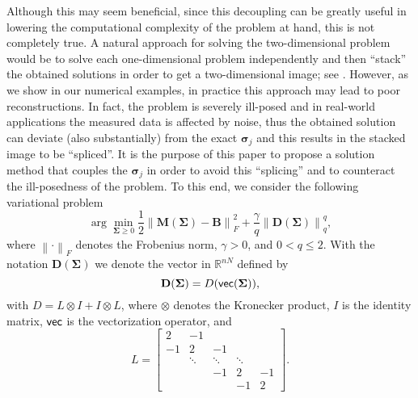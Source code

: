 \documentclass[final,leqno]{siamltex}
\newcommand{\R}{{\mathbb R}}
\newcommand{\ts}[1]{\mbox{\textsf{#1}}}
\newcommand{\norm}[1]{\left\| #1 \right\|}
\newcommand{\sigmab}{\boldsymbol{\sigma}}
\newcommand{\Sigmab}{\mathbf{\Sigma}}
\begin{document}
Although this may seem beneficial, since this decoupling can be greatly useful in lowering the computational complexity of the problem at hand, this is not completely true. A natural approach for solving the two-dimensional problem would be to solve each one-dimensional problem independently and then ``stack'' the obtained solutions in order to get a two-dimensional image; see \cite{ddrv19}. However, as we show in our numerical examples, in practice this approach may lead to poor reconstructions. In fact, the problem is severely ill-posed and in real-world applications the measured data is affected by noise, thus the obtained solution can deviate (also substantially) from the exact $\sigmab_j$ and this results in the stacked image to be ``spliced''. It is the purpose of this paper to propose a solution method that couples the $\sigmab_j$ in order to avoid this ``splicing'' and to counteract the ill-posedness of the problem. To this end, we consider the following variational problem 
\begin{equation}\label{eq:model}
	\arg\min_{\Sigmab\geq 0}\frac{1}{2}\norm{\mathbf{M}(\mathbf{\Sigma})-\mathbf{B}}_F^2+\frac{\gamma}{q}\norm{\mathbf{D}(\mathbf{\Sigma})}_q^q,
\end{equation}
where $\norm{\cdot}_F$ denotes the Frobenius norm, $\gamma>0$, and $0<q\leq 2$. With the notation $\mathbf{D}(\mathbf{\Sigma})$ we denote the vector in $\R^{nN}$ defined by
$$
\mathbf{D}(\mathbf{\Sigma})=D(\ts{vec}(\mathbf{\Sigma})),
$$
with
${D}={L}\otimes {I}+{I}\otimes {L}$, where $\otimes$ denotes the Kronecker product, ${I}$ is the identity matrix, $\ts{vec}$ is the vectorization operator, and 
$$
{L}=\begin{bmatrix}
2 &-1\\
-1&2&-1\\
  & \ddots &\ddots&\ddots\\
  &  &      -1&2&-1\\
  &  &      &  -1&2
\end{bmatrix}.
$$
\end{document}

